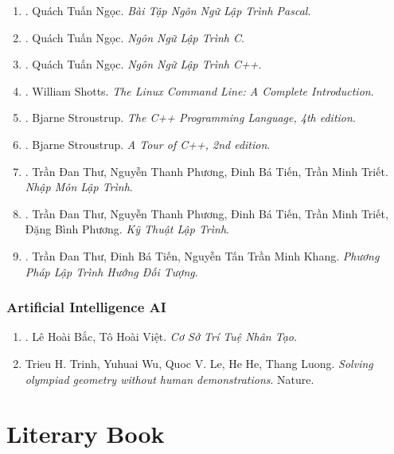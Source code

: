 \documentclass{article}
\begin{document}
\begin{enumerate}
	\item \cite{Ngoc_BT_Pascal}. Quách Tuấn Ngọc. \textit{Bài Tập Ngôn Ngữ Lập Trình Pascal}.\hfill{\sf[reading]}
	\item \cite{Ngoc_C}. Quách Tuấn Ngọc. \textit{Ngôn Ngữ Lập Trình C}.\hfill{\sf[reading]}
	\item \cite{Ngoc_C++}. Quách Tuấn Ngọc. \textit{Ngôn Ngữ Lập Trình C++}.\hfill{\sf[done]}
	\item \cite{Shotts2019}. William Shotts. \textit{The Linux Command Line: A Complete Introduction}.\hfill{\sf[reading]}
	\item \cite{Stroustrup2013}. Bjarne Stroustrup. \textit{The C++ Programming Language, 4th edition}.\hfill{\sf[reading]}
	\item \cite{Stroustrup2018}. Bjarne Stroustrup. \textit{A Tour of C++, 2nd edition}.\hfill{\sf[reading]}
	\item \cite{Thu_Phuong_Tien_Triet_NMLT}. Trần Đan Thư, Nguyễn Thanh Phương, Đinh Bá Tiến, Trần Minh Triết. \textit{Nhập Môn Lập Trình}.\hfill{\sf[reading]}
	\item \cite{Thu_Phuong_Tien_Triet_Phuong_KTLT}. Trần Đan Thư, Nguyễn Thanh Phương, Đinh Bá Tiến, Trần Minh Triết, Đặng Bình Phương. \textit{Kỹ Thuật Lập Trình}.\hfill{\sf[reading]}
	\item \cite{Thu_Tien_Khang_PPLTHDT}. Trần Đan Thư, Đinh Bá Tiến, Nguyễn Tấn Trần Minh Khang. \textit{Phương Pháp Lập Trình Hướng Đối Tượng}.\hfill{\sf[reading]}
\end{enumerate}

\subsubsection{Artificial Intelligence AI}

\begin{enumerate}
	\item \cite{Bac_Viet_AI}. Lê Hoài Bắc, Tô Hoài Việt. \textit{Cơ Sở Trí Tuệ Nhân Tạo}.\hfill{\sf[done]}
	\item Trieu H. Trinh, Yuhuai Wu, Quoc V. Le, He He, Thang Luong. \textit{Solving olympiad geometry without human demonstrations}. Nature.\hfill{\sf[reading]}
\end{enumerate}


\section{Literary Book}
\end{document}
